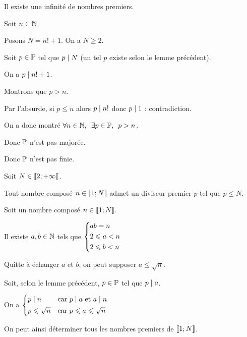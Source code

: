 \begin{theo}
Il existe une infinité de nombres premiers.
\end{theo}

\begin{dem}
Soit \(n\in\N\).

Posons \(N=n!+1\). On a \(N\geq2\).

Soit \(p\in\prem\) tel que \(p\divise N\) (un tel \(p\) existe selon le lemme précédent).

On a \(p\divise n!+1\).

Montrons que \(p>n\).

Par l'absurde, si \(p\leq n\) alors \(p\divise n!\) donc \(p\divise1\) : contradiction.

On a donc montré \(\quantifs{\forall n\in\N;\exists p\in\prem}p>n\).

Donc \(\prem\) n'est pas majorée.

Donc \(\prem\) n'est pas finie.
\end{dem}

\begin{rem}
Soit \(N\in\interventierie{2}{\pinf}\).

Tout nombre composé \(n\in\interventierii{1}{N}\) admet un diviseur premier \(p\) tel que \(p\leq N\).
\end{rem}

\begin{dem}
Soit un nombre composé \(n\in\interventierii{1}{N}\).

Il existe \(a,b\in\N\) tels que \(\begin{dcases}ab=n \\ 2\leq a<n \\ 2\leq b<n\end{dcases}\)

Quitte à échanger \(a\) et \(b\), on peut supposer \(a\leq\sqrt{n}\).

Soit, selon le lemme précédent, \(p\in\prem\) tel que \(p\divise a\).

On a \(\begin{dcases}p\divise n &\text{car }p\divise a\text{ et }a\divise n \\ p\leq\sqrt{n} &\text{car }p\leq a\leq\sqrt{n}\end{dcases}\)

On peut ainsi déterminer tous les nombres premiers de \(\interventierii{1}{N}\).
\end{dem}

